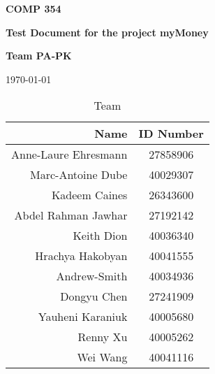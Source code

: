 \documentclass[12pt]{article}
\begin{document}
                \vspace*{0.5in}
                \centerline{\bf\Large COMP 354}
                \centerline{\bf\Large Test Document for the project myMoney}

                \vspace*{0.5in}
                \centerline{\bf\Large Team PA-PK}

                \vspace*{0.5in}
                \centerline{\today}

                \vspace*{1.5in}
                \begin{table}[htbp]
                    \caption{Team}
                    \begin{center}
                        \begin{tabular}{|r | c|}
                            \hline
                            Name & ID Number \\
                            \hline\hline
                            Anne-Laure Ehresmann & 27858906 \\
                            \hline
                            Marc-Antoine Dube & 40029307 \\
                            \hline
                            Kadeem Caines & 26343600 \\
                            \hline
                            Abdel Rahman Jawhar & 27192142 \\
                            \hline
                            Keith Dion & 40036340 \\
                            \hline
                            Hrachya Hakobyan & 40041555 \\
                            \hline
                            Andrew-Smith & 40034936 \\
                            \hline
                            Dongyu Chen & 27241909 \\
                            \hline
                            Yauheni Karaniuk & 40005680 \\
                            \hline
                            Renny Xu & 40005262\\
                            \hline
                            Wei Wang & 40041116 \\
                            \hline
                        \end{tabular}
                    \end{center}
                \end{table}
\end{document}
